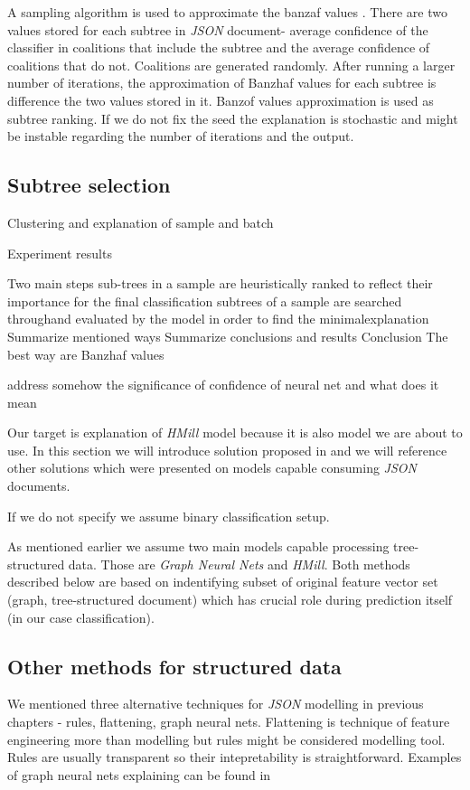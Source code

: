 A sampling algorithm is used to approximate the banzaf values \cite{Bachrach2010}. There are two values stored for each subtree in \emph{JSON} document- average confidence of the classifier in coalitions that include the subtree and the average confidence of coalitions that do not. Coalitions are generated randomly. After running a larger number of iterations, the approximation of Banzhaf values for each subtree is difference the two values stored in it. Banzof values approximation is used as subtree ranking. If we do not fix the seed the explanation is stochastic and might be instable regarding the number of iterations and the output.

\subsection{Subtree selection}

Clustering and explanation of sample and batch

Experiment results

Two main steps
    sub-trees in a sample are heuristically ranked to reflect their importance for the final classification
    subtrees of a sample are searched throughand evaluated by the model in order to find the minimalexplanation
Summarize mentioned ways
Summarize conclusions and results
    Conclusion The best way are Banzhaf values

address somehow the significance of confidence of neural net and what does it mean


Our target is explanation of \emph{HMill} model because it is also model we are about to use. In this section we will introduce solution proposed in \cite{Pevny2020} and we will reference other solutions which were presented on models capable consuming \emph{JSON} documents.

If we do not specify we assume binary classification setup.

As mentioned earlier we assume two main models capable processing tree-structured data. Those are \emph{Graph Neural Nets} and \emph{HMill}. Both methods described below are based on indentifying subset of original feature vector set (graph, tree-structured document) which has crucial role during prediction itself (in our case classification). 

\subsection{Other methods for structured data}
We mentioned three alternative techniques for \emph{JSON} modelling in previous chapters - rules, flattening, graph neural nets. Flattening is technique of feature engineering more than modelling but rules might be considered modelling tool. Rules are usually transparent so their intepretability is straightforward. Examples of graph neural nets explaining can be found in \cite{Ying2019, Huang2020} 

